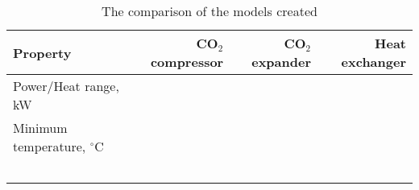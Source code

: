 \begin{table}
\label{tab:DiscussionComparison}
\caption{The comparison of the models created}
\begin{center}
\begin{tabulary}{0.9\textwidth}{LRRR}
\toprule
Property 	&	CO$_2$ compressor & CO$_2$	expander & Heat exchanger \\
\midrule
Power/Heat range, kW& & & \\
Minimum temperature, $^\circ$C& & & \\
& & & \\
& & & \\
& & & \\
& & & \\
& & & \\
\bottomrule
\end{tabulary}
\end{center}
\end{table}